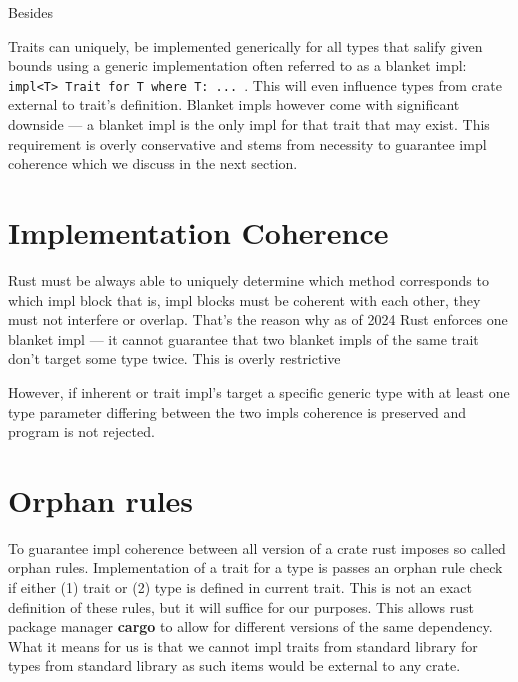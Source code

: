Besides 

Traits can uniquely, be implemented generically for all types that salify given bounds using a generic implementation often referred to as a blanket impl:
\texttt{impl<T> Trait for T where T: ... }.
This will even influence types from crate external to trait's definition. Blanket impls however come with significant downside --- a blanket impl is the only impl for that trait that may exist.
This requirement is overly conservative and stems from necessity to guarantee impl coherence which we discuss in the next section.

\section{Implementation Coherence}
\label{sec:coherence}

Rust must be always able to uniquely determine which method corresponds to which impl block that is, impl blocks must be coherent with each other, they must not interfere or overlap.
That's the reason why as of 2024 Rust enforces one blanket impl --- it cannot guarantee that two blanket impls of the same trait don't target some type twice.
This is overly restrictive 

However, if inherent or trait impl's target a specific generic type with at least one type parameter differing between the two impls coherence is preserved and program is not rejected.

\section{Orphan rules}

To guarantee impl coherence between all version of a crate rust imposes so called orphan rules.
Implementation of a trait for a type is passes an orphan rule check if either (1) trait or (2) type is defined in current trait.
This is not an exact definition of these rules, but it will suffice for our purposes.
This allows rust package manager \textbf{cargo} to allow for different versions of the same dependency.
What it means for us is that we cannot impl traits from standard library for types from standard library as such items would be external to any crate.
